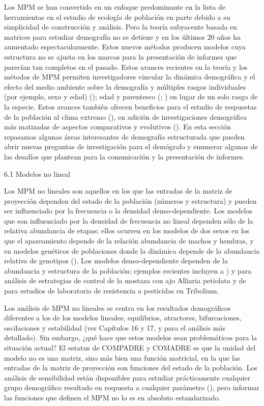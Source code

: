 \documentclass[
]{book}
\theoremstyle{definition}
\theoremstyle{definition}
\theoremstyle{definition}
\theoremstyle{definition}
\theoremstyle{remark}
\begin{document}
Los MPM se han convertido en un enfoque predominante en la lista de herramientas en el estudio de ecología de población en parte debido a su simplicidad de construcción y análisis. Pero la teoría subyacente basada en matrices para estudiar demografía no se detiene y en los últimos 20 años ha aumentado espectacularmente. Estos nuevos métodos producen modelos cuya estructura no se ajusta en los marcos para la presentación de informes que parecían tan completos en el pasado. Estos avances recientes en la teoría y los métodos de MPM permiten investigadores vincular la dinámica demográfica y el efecto del medio ambiente sobre la demografía y múltiples rasgos individuales (por ejemplo, sexo y edad) (\citet{childs2016evolution}); edad y parentesco (\citet{Caswell_41_24}; \citet{caswell2020formal}) en lugar de un solo rasgo de la especie. Estos avances también ofrecen beneficios para el estudio de respuestas de la población al clima extremo (\citet{jenouvrier2022detecting}), en adición de investigaciones demográfica más matizadas de aspectos comparativos y evolutivos (\citet{childs2016evolution}). En esta sección repasamos algunas áreas interesantes de demografía estructurada que pueden abrir nuevas preguntas de investigación para el demógrafo y enumerar algunas de las desafíos que plantean para la comunicación y la presentación de informes.

6.1 \textbar{} Modelos no lineal

Los MPM no lineales son aquellos en los que las entradas de la matriz de proyección dependen del estado de la población (números y estructura) y pueden ser influenciado por la frecuencia o la densidad denso-dependiente. Los modelos que son influenciado por la densidad de frecuencia no lineal dependen sólo de la relativa abundancia de etapas; ellos ocurren en los modelos de dos sexos en los que el apareamiento depende de la relación abundancia de machos y hembras, y en modelos genéticos de poblaciones donde la dinámica depende de la abundancia relativa de genotipos (\citet{de2019selection}). Los modelos denso-dependiente dependen de la abundancia y estructura de la población; ejemplos recientes incluyen a \citet{pardini2009complex}) y \citet{shyu2013seasonal} para análisis de estrategias de control de la mostaza con ajo Alliaria petiolata y de \citet{de2019selection} para estudios de laboratorio de resistencia a pesticidas en Tribolium.

Los análisis de MPM no lineales se centra en los resultados demográficos diferentes a los de los modelos lineales; equilibrios, atractores, bifurcaciones, oscilaciones y estabilidad (ver \citet{caswell2001matrix} Capítulos 16 y 17, y \citet{cushing2003chaos} para el análisis más detallado). Sin embargo, ¿qué hace que estos modelos sean problemáticos para la situación actual? El estatus de COMPADRE y COMADRE es que la unidad del modelo no es una matriz, sino más bien una función matricial, en la que las entradas de la matriz de proyección son funciones del estado de la población. Los análisis de sensibilidad están disponibles para estudiar prácticamente cualquier grupo demográfico resultado en respuesta a cualquier parámetro (\citet{caswell2019sensitivity}), pero informar las funciones que definen el MPM no lo es en absoluto estandarizado.
\end{document}
